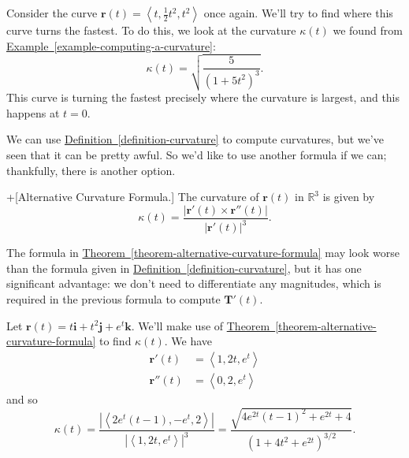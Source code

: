 \documentclass[10pt,]{book}
\theoremstyle{ptxplainnotitle}
\theoremstyle{ptxplaintitle}
\theoremstyle{ptxplainnotitle}
\theoremstyle{ptxplaintitle}
\theoremstyle{ptxplainnotitle}
\theoremstyle{ptxplaintitle}
\theoremstyle{ptxdefinitionnotitle}
\theoremstyle{ptxdefinitiontitle}
\theoremstyle{ptxdefinitionnotitle}
\theoremstyle{ptxdefinitiontitle}
\theoremstyle{ptxdefinitionnotitle}
\theoremstyle{ptxdefinitiontitle}
\theoremstyle{ptxdefinitionnotitle}
\theoremstyle{ptxdefinitiontitle}
\theoremstyle{ptxdefinitionnotitle}
\theoremstyle{ptxdefinitiontitle}
\numberwithin{equation}{section}
\newcommand{\RR}{\mathbb{R}}
\newcommand{\vv}[1]{\mathbf{#1}}
\newcommand{\dotprod}[1]{\left\langle #1 \right\rangle}
\begin{document}
\begin{example}\label{example-using-curvature}
\hypertarget{p-948}{}%
Consider the curve \(\vv{r}(t) = \dotprod{t,\frac{1}{2}t^{2},t^{2}}\) once again. We'll try to find where this curve turns the fastest. To do this, we look at the curvature \(\kappa(t)\) we found from \hyperref[example-computing-a-curvature]{Example~\ref{example-computing-a-curvature}}:%
%
\begin{equation*}
\kappa(t) = \sqrt{\frac{5}{(1+5t^{2})^{3}}}.
\end{equation*}
\hypertarget{p-949}{}%
This curve is turning the fastest precisely where the curvature is largest, and this happens at \(t=0\).%
\end{example}
\hypertarget{p-950}{}%
We can use \hyperref[definition-curvature]{Definition~\ref{definition-curvature}} to compute curvatures, but we've seen that it can be pretty awful. So we'd like to use another formula if we can; thankfully, there is another option.%
\begin{theorem}+[{Alternative Curvature Formula.}]\label{theorem-alternative-curvature-formula}
\hypertarget{p-951}{}%
The curvature of \(\vv{r}(t)\) in \(\RR^{3}\) is given by%
%
\begin{equation*}
\kappa(t) = \frac{|\vv{r}'(t)\times\vv{r}''(t)|}{|\vv{r}'(t)|^{3}}.
\end{equation*}
\end{theorem}
\hypertarget{p-952}{}%
The formula in \hyperref[theorem-alternative-curvature-formula]{Theorem~\ref{theorem-alternative-curvature-formula}} may look worse than the formula given in \hyperref[definition-curvature]{Definition~\ref{definition-curvature}}, but it has one significant advantage: we don't need to differentiate any magnitudes, which is required in the previous formula to compute \(\vv{T}'(t)\).%
\begin{example}\label{example-using-the-alternative-formula}
\hypertarget{p-953}{}%
Let \(\vv{r}(t) = t\vv{i}+t^{2}\vv{j}+e^{t}\vv{k}\). We'll make use of \hyperref[theorem-alternative-curvature-formula]{Theorem~\ref{theorem-alternative-curvature-formula}} to find \(\kappa(t).\) We have%
%
\begin{align*}
\vv{r}'(t) & = \dotprod{1,2t,e^{t}} \\
\vv{r}''(t) & = \dotprod{0,2,e^{t}} 
\end{align*}
\hypertarget{p-954}{}%
and so%
%
\begin{equation*}
\kappa(t) = \frac{|\dotprod{2e^{t}(t-1),-e^{t},2}|}{|\dotprod{1,2t,e^{t}}|^{3}} = \frac{\sqrt{4e^{2t}(t-1)^{2}+e^{2t}+4}}{(1+4t^{2}+e^{2t})^{3/2}}.
\end{equation*}
\end{example}
\typeout{************************************************}
\typeout{************************************************}
\end{document}
